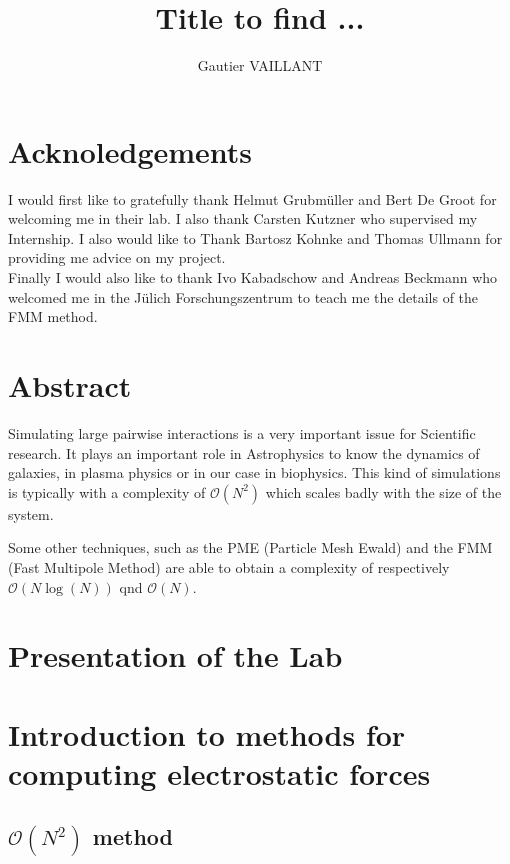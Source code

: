 \documentclass[12pt,twoside,a4paper]{report}
\title{Title to find ...}
\author{Gautier VAILLANT}
\begin{document}
\maketitle

\chapter*{Acknoledgements}

I would first like to gratefully thank Helmut Grubmüller and Bert De Groot for welcoming me in their lab. I also thank Carsten Kutzner who supervised my Internship. I also would like to Thank Bartosz Kohnke and Thomas Ullmann for providing me advice on my project.\\ 

Finally I would also like to thank Ivo Kabadschow and Andreas Beckmann who welcomed me in the Jülich Forschungszentrum to teach me the details of the FMM method. 

\chapter*{Abstract}

Simulating large pairwise interactions is a very important issue for Scientific research. It plays an important role in Astrophysics to know the dynamics of galaxies, in plasma physics or in our case in biophysics. This kind of simulations is typically with a complexity of $\mathcal{O}(N^2)$ which scales badly with the size of the system.

Some other techniques, such as the PME (Particle Mesh Ewald) and the FMM (Fast Multipole Method) are able to obtain a complexity of respectively $\mathcal{O}(N\log(N))$ qnd $\mathcal{O}(N)$.



\tableofcontents

\chapter*{Presentation of the Lab}

\chapter{Introduction to methods for computing electrostatic forces}


\section{$\mathcal{O}(N^2)$ method }
\end{document}
